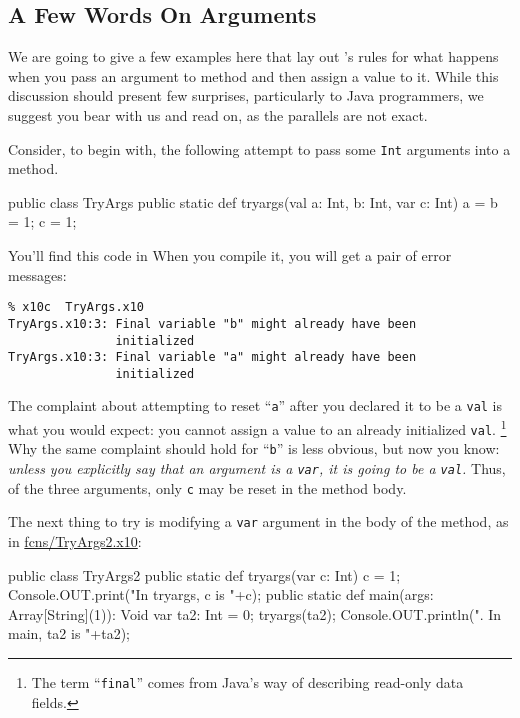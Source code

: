 \subsection{A Few Words On Arguments}
We are going
to give a few examples here that lay out \Xten's rules for what happens when you pass
an argument to method and then assign a value to it.  While this discussion should present
few surprises, particularly to Java programmers, we suggest you bear with us and read on,
as the parallels are not exact.

Consider, to begin with, the following attempt to pass some {\tt Int} arguments into a method.
\begin{xtennum}[]
public class TryArgs {
   public static def tryargs(val a: Int, b: Int, var c: Int) {
      a = b = 1;  
      c = 1;       
   }
}
\end{xtennum}
You'll find this code in 
When you compile it, you will get a pair of error messages:
\begin{verbatim}
% x10c  TryArgs.x10
TryArgs.x10:3: Final variable "b" might already have been
               initialized
TryArgs.x10:3: Final variable "a" might already have been
               initialized
\end{verbatim}
The complaint about attempting to reset ``{\tt a}'' after you declared it to be a
{\tt val} is what you would expect: you cannot assign a value to an already initialized
 {\tt val}.
 \footnote{
 The term ``{\tt final}'' comes from Java's way of describing read-only
 data fields.
 }
Why the same complaint should hold for ``{\tt b}'' is less
obvious, but now you know: {\em unless you explicitly say that an argument is a {\tt var}, it is
going to be a {\tt val}.}   Thus, of the three arguments, only {\tt c} may be reset in the
method body.

The next thing to try is modifying a {\tt var} argument in the body of the method, as in 
\href{http://dist.codehaus.org/x10/documentation/guide/src/fcns/TryArgs2.x10}{fcns/TryArgs2.x10}: 
\begin{xtennum}[]
public class TryArgs2 {
   public static def tryargs(var c: Int) {
      c = 1;   
      Console.OUT.print("In tryargs, c is "+c);
   }
   public static def main(args: Array[String](1)): Void {
      var ta2: Int = 0;
      tryargs(ta2);
      Console.OUT.println(".  In main, ta2 is "+ta2);     
   }
}
\end{xtennum}
